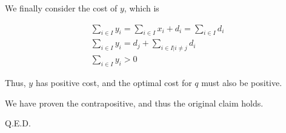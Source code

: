 \documentclass[11pt,a4paper]{article}
\begin{document}
We finally consider the cost of $y$, which is

\begin{equation}
\begin{split}
\sum_{i\in I} y_i =\sum_{i\in I} x_i+d_i=\sum_{i\in I}d_i\\
\sum_{i\in I} y_i = d_j +\sum_{i\in I|i\neq j}d_i\\
\sum_{i\in I} y_i > 0
\end{split}
\end{equation}

Thus, $y$ has positive cost, and the optimal cost for $q$ must also be positive.

We have proven the contrapositive, and thus the original claim holds.

Q.E.D.
\end{document}
